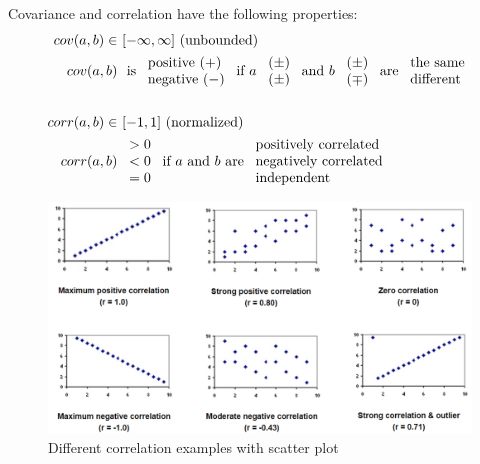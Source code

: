 Covariance and correlation have the following properties:
\begin{align*}
  cov(a, b) \in &\ [-\infty, \infty] \text{ (unbounded)}\\
  cov(a, b) &\ \text{ is }\begin{array}{l}
    \text{positive } (+)\\\text{negative } (-)
  \end{array}\text{ if } a \text{ }\begin{array}{l}
    (\pm)\\(\pm)
  \end{array}\text{ and } b \text{ }\begin{array}{l}
    (\pm)\\(\mp)
  \end{array} \text{ are }\begin{array}{l}
    \text{the same}\\\text{different}
  \end{array}\allowdisplaybreaks\\\\
  corr(a, b) \in &\ [-1, 1] \text{ (normalized)}\\
  corr(a, b)&\ \begin{array}{l}
    >0\\<0\\=0
  \end{array}\text{ if } a \text{ and } b \text{ are }\begin{array}{l}
    \text{positively correlated}\\
    \text{negatively correlated}\\
    \text{independent}
  \end{array}
\end{align*}

\begin{figure}[H]
  \centering
  \includegraphics[width=\textwidth]{assets/visualization_and_extraction/feature_relation/corr_examples.png}
  \caption{Different correlation examples with scatter plot}
  \label{fig:2_corr_examples}
\end{figure}

